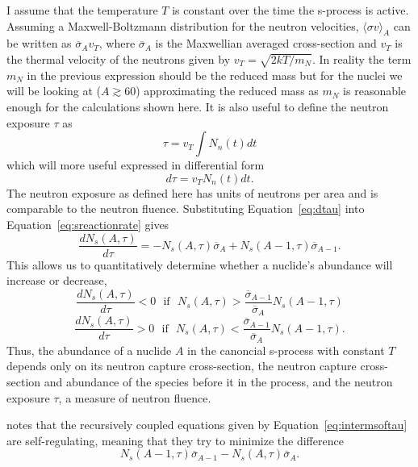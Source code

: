 I assume that the temperature $T$ is constant over the time the
s-process is active.  Assuming a Maxwell-Boltzmann distribution 
for the neutron velocities, 
$\langle \sigma v \rangle_A$ can be written as
$ \overline{\sigma}_A v_T$, where $ \overline{\sigma}_A$ is the
Maxwellian averaged cross-section and $v_T$ is the thermal velocity of
the neutrons given by $v_T = \sqrt{2kT/m_N}$.  In reality the term
$m_N$ in the previous expression should be the reduced mass but for the
nuclei we will be looking at ($A \gtrsim 60$) approximating the
reduced mass as $m_N$ is reasonable enough for the calculations shown
here.  It is also useful to define the neutron exposure $\tau$ as
\begin{equation}
\tau = v_T \int N_n(t)dt
\end{equation}
which will more useful expressed in differential form
\begin{equation}
\label{eq:dtau}
d\tau = v_TN_n(t)dt.
\end{equation}
The neutron exposure as defined here has units of neutrons per area
and is comparable to the neutron fluence.  Substituting
Equation~\ref{eq:dtau} into Equation~\ref{eq:sreactionrate} gives
\begin{equation}
\label{eq:intermsoftau}
\frac{dN_s(A,\tau)}{d\tau} = -N_s(A,\tau)\overline{\sigma}_A +
N_s(A-1,\tau)\overline{\sigma}_{A-1}.
\end{equation}
This allows us to quantitatively determine whether a nuclide's
abundance will increase or decrease,
\begin{equation*}
\frac{dN_s(A,\tau)}{d\tau} < 0 ~~~\textrm{if}~~~ N_s(A,\tau)
> \frac{\overline{\sigma}_{A-1}}{\overline{\sigma}_{A}}N_s(A-1,\tau) 
\end{equation*}
\begin{equation}
\frac{dN_s(A,\tau)}{d\tau} > 0 ~~~\textrm{if}~~~ N_s(A,\tau)
< \frac{\overline{\sigma}_{A-1}}{\overline{\sigma}_{A}}N_s(A-1,\tau).
\end{equation}
Thus, the abundance of a nuclide $A$ in the canoncial s-process with
constant $T$ depends only on its neutron capture cross-section, the
neutron capture cross-section and abundance of the species before it 
in the process, and the neutron exposure $\tau$, a measure of neutron
fluence.

\cite{iliadis2008} notes that the recursively coupled equations given
by Equation~\ref{eq:intermsoftau} are self-regulating, meaning that
they try to minimize the difference
\begin{equation}
N_s(A-1,\tau)\overline{\sigma}_{A-1} -
N_s(A,\tau)\overline{\sigma}_{A}.  
\end{equation}

